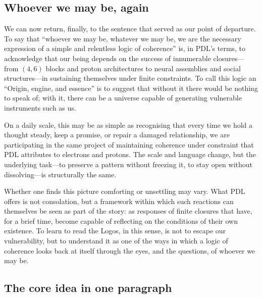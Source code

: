 \documentclass[11pt,a4paper]{article}
\theoremstyle{definition}
\begin{document}
\subsection{Whoever we may be, again}

We can now return, finally, to the sentence that served as our point of departure. To say that ``whoever we may be, whatever we may be, we are the necessary expression of a simple and relentless logic of coherence'' is, in PDL’s terms, to acknowledge that our being depends on the success of innumerable closures---from \((4,6)\) blocks and proton architectures to neural assemblies and social structures---in sustaining themselves under finite constraints.\cite{Laubscher_EmergencePhysicalReality_2024,Laubscher_ProtonArch_v2_2024,Laubscher_Existence_PulsatingClosure_2026} To call this logic an ``Origin, engine, and essence'' is to suggest that without it there would be nothing to speak of; with it, there can be a universe capable of generating vulnerable instruments such as us. 

On a daily scale, this may be as simple as recognising that every time we hold a thought steady, keep a promise, or repair a damaged relationship, we are participating in the same project of maintaining coherence under constraint that PDL attributes to electrons and protons. The scale and language change, but the underlying task—to preserve a pattern without freezing it, to stay open without dissolving—is structurally the same.

Whether one finds this picture comforting or unsettling may vary. What PDL offers is not consolation, but a framework within which such reactions can themselves be seen as part of the story: as responses of finite closures that have, for a brief time, become capable of reflecting on the conditions of their own existence. To learn to read the Logos, in this sense, is not to escape our vulnerability, but to understand it as one of the ways in which a logic of coherence looks back at itself through the eyes, and the questions, of whoever we may be.

\subsection*{The core idea in one paragraph}
\end{document}
